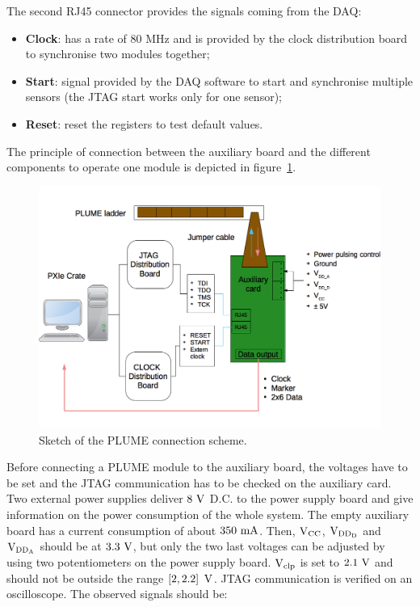   The second RJ45 connector provides the signals coming from the \gls{DAQ}:
  \begin{itemize}
    \item \textbf{Clock}: has a rate of 80 MHz and is provided by the clock distribution board to synchronise two modules together;
    \item \textbf{Start}: signal provided by the \gls{DAQ} software to start and synchronise multiple sensors (the \gls{JTAG} start works only for one sensor);
    \item \textbf{Reset}: reset the registers to test default values. 
  \end{itemize}

  The principle of connection between the auxiliary board and the different components to operate one module is depicted in figure~\ref{fig:plumeAux}.
  
  \begin{figure}[!tbh]
    \centering
    \includegraphics[width=\textwidth]{Pictures/labTests/plumeAux.png}
    \caption{Sketch of the PLUME connection scheme.}
    \label{fig:plumeAux}
  \end{figure}

  Before connecting a PLUME module to the auxiliary board, the voltages have to be set and the \gls{JTAG} communication has to be checked on the auxiliary card.
  Two external power supplies deliver $8~\rm{V}$ D.C. to the power supply board and give information on the power consumption of the whole system.
  The empty auxiliary board has a current consumption of about $350~\rm{mA}$.
  Then, $\rm{V}_{\rm{CC}}$, $\rm{V}_{\rm{DD_D}}$ and $\rm{V}_{\rm{DD_A}}$ should be at $3.3~\rm{V}$, but only the two last voltages can be adjusted by using two potentiometers on the power supply board.
  $\rm{V}_{\rm{clp}}$ is set to $2.1~\rm{V}$ and should not be outside the range $\left[2, 2.2\right]~\rm{V}$.
  \gls{JTAG} communication is verified on an oscilloscope.
  The observed signals should be:

